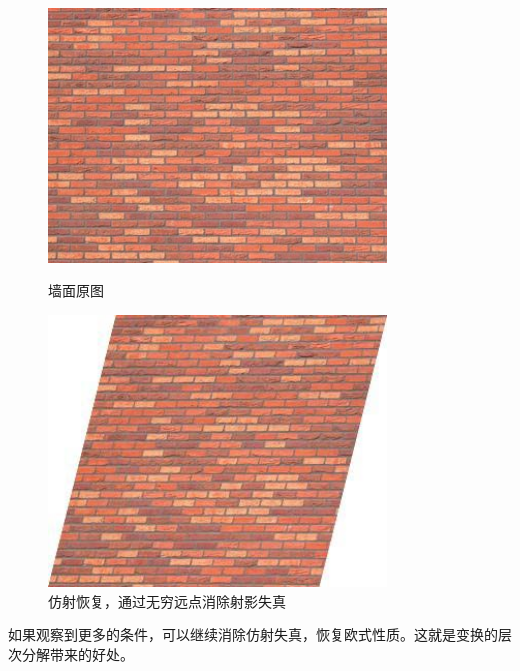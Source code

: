 \documentclass[hpyerref,UTF8,a4paper,titlepage,12pt,oneside]{ctexbook}
\theoremstyle{definition}
\begin{document}
		\begin{figure}[H]
			\begin{minipage}[t]{0.52\linewidth}
				\centering
				\includegraphics[width=0.8\textwidth]{images/origin_.jpeg}
				\caption{墙面原图}
			\end{minipage}		
			\begin{minipage}[t]{0.5\linewidth}
				\centering
				\includegraphics[width=0.8\textwidth]{images/affine_.jpeg}
				\caption{仿射恢复，通过无穷远点消除射影失真}
			\end{minipage}			
		\end{figure}
		
		如果观察到更多的条件，可以继续消除仿射失真，恢复欧式性质。这就是变换的层次分解带来的好处。
\end{document}

